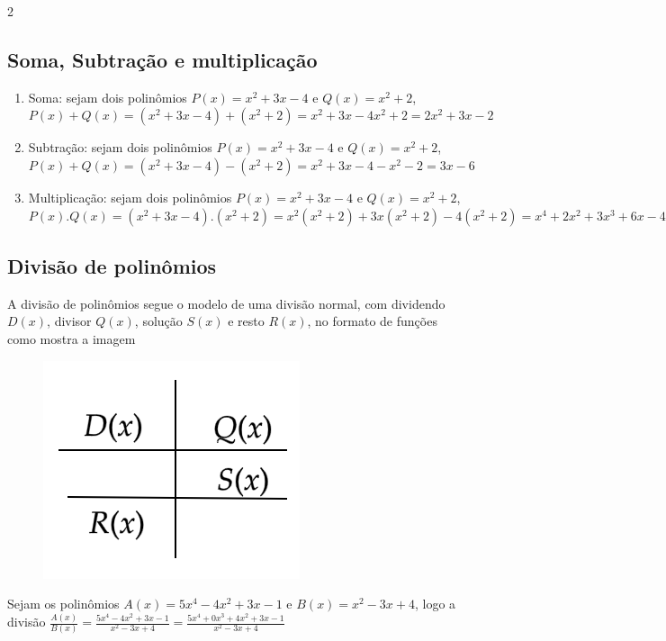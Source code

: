 \begin{multicols*}{2}
    \subsection*{Soma, Subtração e multiplicação}
    \begin{enumerate}[wide, labelwidth=!, labelindent=0pt]
        \item Soma: sejam dois polinômios $P(x) = x^2 + 3x - 4$ e $Q(x) = x^2 +2$,
              $P(x) + Q(x) = (x^2 + 3x - 4) + (x^2 +2) = x^2 +3x -4 x^2 +2 = 2x^2 + 3x -2$
        \item Subtração: sejam dois polinômios $P(x) = x^2 + 3x - 4$ e $Q(x) = x^2 +2$,
              $P(x) + Q(x) = (x^2 + 3x - 4) - (x^2 +2) = x^2 + 3x - 4 - x^2 - 2 = 3x - 6$
        \item Multiplicação: sejam dois polinômios $P(x) = x^2 + 3x - 4$ e $Q(x) = x^2 +2$,
              $P(x).Q(x) = (x^2 + 3x - 4).(x^2 +2) = x^2(x^2 +2) + 3x(x^2 +2) - 4(x^2 +2) =
                  x^4 + 2x^2 + 3x^3 + 6x - 4x^2 -8 = x^4 + 3x^3 - 2x^2 + 6x - 8$
    \end{enumerate}
    \subsection*{Divisão de polinômios}
    A divisão de polinômios segue o modelo de uma divisão normal, com dividendo $D(x)$, divisor 			$Q(x)$, solução $S(x)$ e resto $R(x)$, no formato de funções como mostra a imagem
    \begin{figure}[H]
        \centering
        \includegraphics[scale=0.3]{assets/rafael/img21.png}
    \end{figure}

    Sejam os polinômios $A(x) = 5x^4 - 4x^2 + 3x - 1 $ e $B(x) = x^2 - 3x + 4$, logo a divisão
    $\frac{A(x)}{B(x)} = \frac{ 5x^4 - 4x^2 + 3x - 1 }{x^2 - 3x + 4} =
        \frac{ 5x^4 +0x^3 + 4x^2 + 3x - 1 }{x^2 - 3x + 4} $


\end{multicols*}
